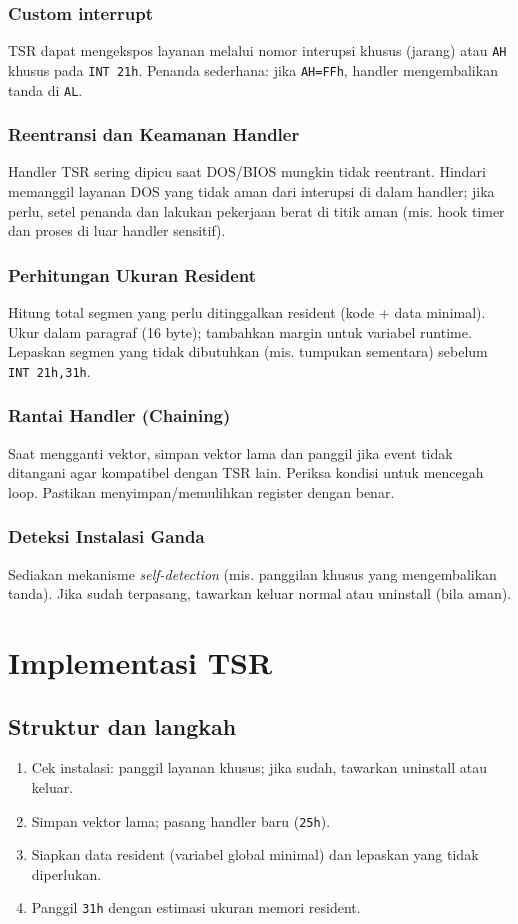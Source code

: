 \subsubsection{Custom interrupt}
TSR dapat mengekspos layanan melalui nomor interupsi khusus (jarang) atau \texttt{AH} khusus pada \texttt{INT 21h}. Penanda sederhana: jika \texttt{AH=FFh}, handler mengembalikan tanda di \texttt{AL}.

\subsubsection{Reentransi dan Keamanan Handler}
Handler TSR sering dipicu saat DOS/BIOS mungkin tidak reentrant. Hindari memanggil layanan DOS yang tidak aman dari interupsi di dalam handler; jika perlu, setel penanda dan lakukan pekerjaan berat di titik aman (mis. hook timer dan proses di luar handler sensitif). \cite{rbil}

\subsubsection{Perhitungan Ukuran Resident}
Hitung total segmen yang perlu ditinggalkan resident (kode + data minimal). Ukur dalam paragraf (16 byte); tambahkan margin untuk variabel runtime. Lepaskan segmen yang tidak dibutuhkan (mis. tumpukan sementara) sebelum \texttt{INT 21h,31h}. \cite{rbil}

\subsubsection{Rantai Handler (Chaining)}
Saat mengganti vektor, simpan vektor lama dan panggil jika event tidak ditangani agar kompatibel dengan TSR lain. Periksa kondisi untuk mencegah loop. Pastikan menyimpan/memulihkan register dengan benar. \cite{rbil}

\subsubsection{Deteksi Instalasi Ganda}
Sediakan mekanisme \textit{self-detection} (mis. panggilan khusus yang mengembalikan tanda). Jika sudah terpasang, tawarkan keluar normal atau uninstall (bila aman). \cite{rbil}

\section{Implementasi TSR}
\subsection{Struktur dan langkah}
\begin{enumerate}
  \item Cek instalasi: panggil layanan khusus; jika sudah, tawarkan uninstall atau keluar.
  \item Simpan vektor lama; pasang handler baru (\texttt{25h}).
  \item Siapkan data resident (variabel global minimal) dan lepaskan yang tidak diperlukan.
  \item Panggil \texttt{31h} dengan estimasi ukuran memori resident.
\end{enumerate}

